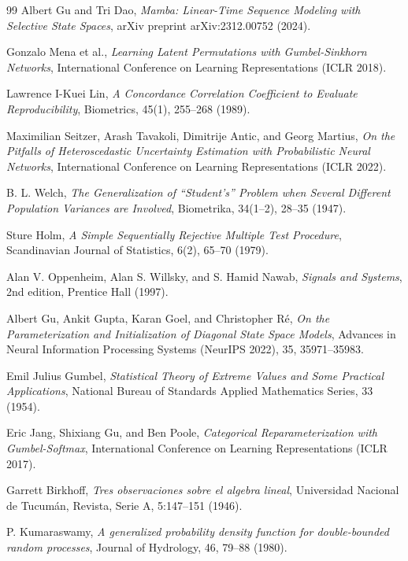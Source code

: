 \documentclass[10pt,a4paper,twocolumn]{article}
\begin{document}
\begin{thebibliography}{99}
		Albert Gu and Tri Dao, \emph{Mamba: Linear-Time Sequence Modeling with Selective State Spaces}, arXiv preprint arXiv:2312.00752 (2024).
		
		Gonzalo Mena et al., \emph{Learning Latent Permutations with Gumbel-Sinkhorn Networks}, International Conference on Learning Representations (ICLR 2018).
		
		Lawrence I-Kuei Lin, \emph{A Concordance Correlation Coefficient to Evaluate Reproducibility}, Biometrics, 45(1), 255--268 (1989).
		
		 Maximilian Seitzer, Arash Tavakoli, Dimitrije Antic, and Georg Martius, \emph{On the Pitfalls of Heteroscedastic Uncertainty Estimation with Probabilistic Neural Networks}, International Conference on Learning Representations (ICLR 2022).
		
		 B. L. Welch, \emph{The Generalization of ``Student's'' Problem when Several Different Population Variances are Involved}, Biometrika, 34(1--2), 28--35 (1947).
		
		 Sture Holm, \emph{A Simple Sequentially Rejective Multiple Test Procedure}, Scandinavian Journal of Statistics, 6(2), 65--70 (1979).
		
		 Alan V. Oppenheim, Alan S. Willsky, and S. Hamid Nawab, \emph{Signals and Systems}, 2nd edition, Prentice Hall (1997).
		
		 Albert Gu, Ankit Gupta, Karan Goel, and Christopher R\'{e}, \emph{On the Parameterization and Initialization of Diagonal State Space Models}, Advances in Neural Information Processing Systems (NeurIPS 2022), 35, 35971--35983.
		
		Emil Julius Gumbel, \emph{Statistical Theory of Extreme Values and Some Practical Applications}, National Bureau of Standards Applied Mathematics Series, 33 (1954).
		
		Eric Jang, Shixiang Gu, and Ben Poole, \emph{Categorical Reparameterization with Gumbel-Softmax}, International Conference on Learning Representations (ICLR 2017).
		
		Garrett Birkhoff, \emph{Tres observaciones sobre el algebra lineal}, Universidad Nacional de Tucum\'{a}n, Revista, Serie A, 5:147--151 (1946).
		
		P. Kumaraswamy, \emph{A generalized probability density function for double-bounded random processes}, Journal of Hydrology, 46, 79--88 (1980).
		

\end{thebibliography}
\end{document}
